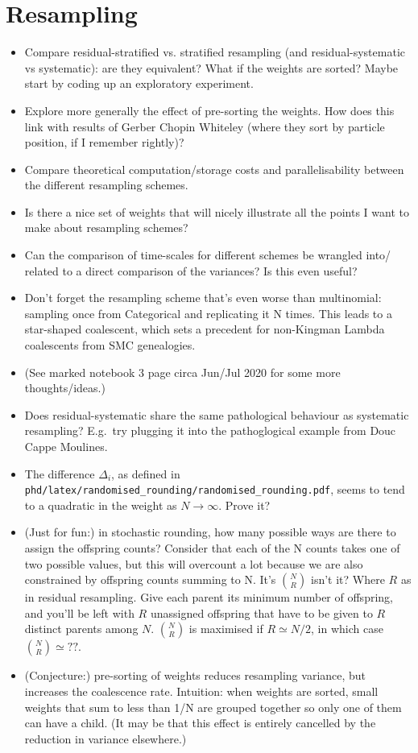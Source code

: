 \documentclass{article}
\begin{document}
\section*{Resampling}
\begin{itemize}
\item Compare residual-stratified vs. stratified resampling (and residual-systematic vs systematic): are they equivalent? What if the weights are sorted? Maybe start by coding up an exploratory experiment.
\item Explore more generally the effect of pre-sorting the weights. How does this link with results of Gerber Chopin Whiteley (where they sort by particle position, if I remember rightly)?
\item Compare theoretical computation/storage costs and parallelisability between the different resampling schemes.
\item Is there a nice set of weights that will nicely illustrate all the points I want to make about resampling schemes?
\item Can the comparison of time-scales for different schemes be wrangled into/ related to a direct comparison of the variances? Is this even useful?
\item Don't forget the resampling scheme that's even worse than multinomial: sampling once from Categorical and replicating it N times. This leads to a star-shaped coalescent, which sets a precedent for non-Kingman Lambda coalescents from SMC genealogies.
\item (See marked notebook 3 page circa Jun/Jul 2020 for some more thoughts/ideas.)
\item Does residual-systematic share the same pathological behaviour as systematic resampling? E.g.\ try plugging it into the pathoglogical example from Douc Cappe Moulines.
\item The difference $\Delta_i$, as defined in \texttt{phd/latex/randomised\_rounding/randomised\_rounding.pdf}, seems to tend to a quadratic in the weight as $N\to\infty$. Prove it?
\item (Just for fun:) in stochastic rounding, how many possible ways are there to assign the offspring counts? Consider that each of the N counts takes one of two possible values, but this will overcount a lot because we are also constrained by offspring counts summing to N. It's $\binom{N}{R}$ isn't it? Where $R$ as in residual resampling. Give each parent its minimum number of offspring, and you'll be left with $R$ unassigned offspring that have to be given to $R$ distinct parents among $N$. $\binom{N}{R}$ is maximised if $R\simeq N/2$, in which case $\binom{N}{R}\simeq ??$.
\item (Conjecture:) pre-sorting of weights reduces resampling variance, but increases the coalescence rate. Intuition: when weights are sorted, small weights that sum to less than 1/N are grouped together so only one of them can have a child. (It may be that this effect is entirely cancelled by the reduction in variance elsewhere.)
\end{itemize}
\end{document}

